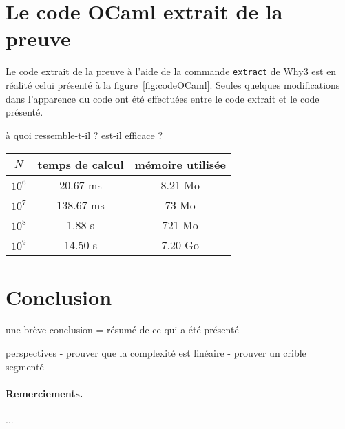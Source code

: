 \documentclass[a4paper]{easychair}
\begin{document}
\section{Le code OCaml extrait de la preuve}

Le code extrait de la preuve à l'aide de la commande \texttt{extract} de Why3
est en réalité celui présenté à la figure~\ref{fig:codeOCaml}.
Seules quelques modifications dans l'apparence du code ont été effectuées
entre le code extrait et le code présenté.

à quoi ressemble-t-il ?
est-il efficace ?

\begin{center}
  \begin{tabular}{|c|c|c|}
    \hline
    $N$ & temps de calcul & mémoire utilisée \\
    \hline\hline
    $10^6$ & 20.67 ms & 8.21 Mo \\\hline
    $10^7$ & 138.67 ms & 73 Mo \\\hline
    $10^8$ & 1.88 s & 721 Mo \\\hline
    $10^9$ & 14.50 s & 7.20 Go \\\hline
  \end{tabular}
\end{center}

\section{Conclusion}
\label{sec:conclusion}

une brève conclusion = résumé de ce qui a été présenté

perspectives
- prouver que la complexité est linéaire
- prouver un crible segmenté~\cite{crible-segmente}


\paragraph{Remerciements.} ...



\end{document}

